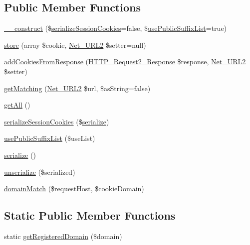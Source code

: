 \subsection*{Public Member Functions}
\begin{DoxyCompactItemize}
\item 
\hyperlink{classHTTP__Request2__CookieJar_a0df8fa6c7a4d383b595fa62a62d280f1}{\-\_\-\-\_\-construct} (\$\hyperlink{classHTTP__Request2__CookieJar_a2a81535d5a9762c3d6ae9229f2349813}{serialize\-Session\-Cookies}=false, \$\hyperlink{classHTTP__Request2__CookieJar_aa5754da6e9d23db800e091bc16fb3bc8}{use\-Public\-Suffix\-List}=true)
\item 
\hyperlink{classHTTP__Request2__CookieJar_a282b74d495d895691cf2dd4e7a7d467e}{store} (array \$cookie, \hyperlink{classNet__URL2}{Net\-\_\-\-U\-R\-L2} \$setter=null)
\item 
\hyperlink{classHTTP__Request2__CookieJar_ac36b125ea28edd3383bfc7122bfe3492}{add\-Cookies\-From\-Response} (\hyperlink{classHTTP__Request2__Response}{H\-T\-T\-P\-\_\-\-Request2\-\_\-\-Response} \$response, \hyperlink{classNet__URL2}{Net\-\_\-\-U\-R\-L2} \$setter)
\item 
\hyperlink{classHTTP__Request2__CookieJar_a1a5ded22296cb2445004e579b8f38eab}{get\-Matching} (\hyperlink{classNet__URL2}{Net\-\_\-\-U\-R\-L2} \$url, \$as\-String=false)
\item 
\hyperlink{classHTTP__Request2__CookieJar_ac38ab1d49f98cb8261b3fe8eeb482125}{get\-All} ()
\item 
\hyperlink{classHTTP__Request2__CookieJar_a2a81535d5a9762c3d6ae9229f2349813}{serialize\-Session\-Cookies} (\$\hyperlink{classHTTP__Request2__CookieJar_ac6fa68d8621d1aef56c0eb8231612839}{serialize})
\item 
\hyperlink{classHTTP__Request2__CookieJar_aa5754da6e9d23db800e091bc16fb3bc8}{use\-Public\-Suffix\-List} (\$use\-List)
\item 
\hyperlink{classHTTP__Request2__CookieJar_ac6fa68d8621d1aef56c0eb8231612839}{serialize} ()
\item 
\hyperlink{classHTTP__Request2__CookieJar_ae63b138701ec28ec7f7c7a2b90f0a3a7}{unserialize} (\$serialized)
\item 
\hyperlink{classHTTP__Request2__CookieJar_ad22bee9ce6d2c111120bf44c3e302401}{domain\-Match} (\$request\-Host, \$cookie\-Domain)
\end{DoxyCompactItemize}
\subsection*{Static Public Member Functions}
\begin{DoxyCompactItemize}
\item 
static \hyperlink{classHTTP__Request2__CookieJar_a66c53f8393c3562e58491105165e77a9}{get\-Registered\-Domain} (\$domain)
\end{DoxyCompactItemize}
